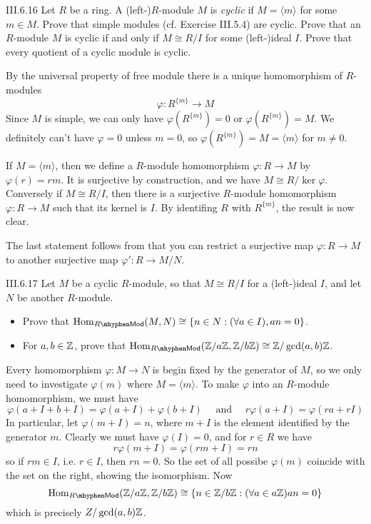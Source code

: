 \begin{problem}{III.6.16}
Let $R$ be a ring. A (left-)$R$-module $M$ is \emph{cyclic} if $M = \langle m \rangle$ for some $m \in M$. Prove that simple modules (cf. Exercise III.5.4) are cyclic. Prove that an $R$-module $M$ is cyclic if and only if $M \cong R/I$ for some (left-)ideal $I.$ Prove that 
every quotient of a cyclic module is cyclic. 
\end{problem}
\begin{pf}
By the universal property of free module there is a unique homomorphism of $R$-modules
\[
\varphi : R^{\{m\}} \to M	
\]
Since $M$ is simple, we can only have $\varphi(R^{\{m\}}) = 0$ or $\varphi(R^{\{m\}}) = M$. We definitely can't have $\varphi = 0$ unless $m = 0$, so $\varphi(R^{\{m\}}) = M = \langle m \rangle$ for $m \neq 0$. 

If $M = \langle m \rangle$, then we define a $R$-module homomorphism $\varphi: R \to M$ by $\varphi(r) = rm$. It is surjective by construction, and we have $M \cong R/\ker \varphi$.
Conversely if $M \cong R/I$, then there is a surjective $R$-module homomorphism $\varphi: R \to M$ such that its kernel is $I$. By identifing $R$ with $R^{\{m\}}$, the result is now clear.

The last statement follows from that you can restrict a surjective map $\varphi: R \to M$ to another surjective map $\varphi': R \to M/N$. 
\end{pf}

\begin{problem}{III.6.17}
Let $M$ be a cyclic $R$-module, so that $M \cong R/I$ for a (left-)ideal $I$, and let $N$ be another $R$-module.
\begin{itemize}
    \setlength\itemsep{0pt}
    \item Prove that $\Hom_{R\mhyphen \mathsf{Mod}}(M,N) \cong \{n \in N : (\forall a \in I), an = 0\}$.
    \item For $a, b \in \mathbb{Z}$, prove that $\Hom_{R \mhyphen \mathsf{Mod}}(\Z/a\Z, \Z/b\Z) \cong \Z/\gcd(a,b)\Z$.
\end{itemize}
\end{problem}
\begin{pf}
Every homomorphism $\varphi: M \to N$ is begin fixed by the generator of $M$, so we only need to investigate $\varphi(m)$ where $M = \langle m \rangle$. To make $\varphi$ into an $R$-module homomorphism, we must have
\[
\varphi(a+I+b+I) = \varphi(a+I) + \varphi(b+I) \quad \text{ and } \quad  r\varphi(a+I) = \varphi(ra+rI)	
\]
In particular, let $\varphi(m+I) = n$, where $m+I$ is the element identified by the generator $m$. Clearly we must have $\varphi(I) = 0$, and for $r \in R$ we have
\[
r\varphi(m+I) = \varphi(rm + I) = rn	
\]
so if $rm \in I$, i.e. $r \in I$, then $rn = 0$. So the set of all possibe $\varphi(m)$ coincide with the set on the right, showing the isomorphism. Now
\[
\Hom_{R \mhyphen \mathsf{Mod}}(\Z/a\Z, \Z/b\Z) \cong \{n \in \Z/b\Z : (\forall a \in a\Z) an = 0\}
\]
which is precisely $Z/\gcd(a,b)\mathbb{Z}$.
\end{pf}

